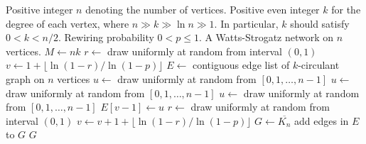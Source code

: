 
\begin{algorithmic}[1]
\Require Positive integer $n$ denoting the number of vertices. Positive
  even integer $k$ for the degree of each vertex, where
  $n \gg k \gg \ln n \gg 1$. In particular, $k$ should satisfy
  $0 < k < n/2$. Rewiring probability $0 < p \leq 1$.
\Ensure A Watts-Strogatz network on $n$ vertices.
\State $M \gets nk$
\State $r \gets$ draw uniformly at random from interval $(0,1)$
\State $v \gets 1 + \lfloor \ln(1 - r) / \ln(1 - p) \rfloor$
\State $E \gets$ contiguous edge list of $k$-circulant graph on $n$ vertices
  \State $u \gets$ draw uniformly at random from $[0, 1, \dots, n-1]$
      \State $u \gets$ draw uniformly at random from $[0, 1, \dots, n-1]$
    \EndWhile
  \Else
      \State $u \gets$ draw uniformly at random from $[0, 1, \dots, n-1]$\label{alg:Watts_Strogatz:choose_vertex_odd_index}
    \EndWhile
  \EndIf
  \State $E[v-1] \gets u$
  \State $r \gets$ draw uniformly at random from interval $(0,1)$
  \State $v \gets v + 1 + \lfloor \ln(1 - r) / \ln(1 - p) \rfloor$
\EndWhile
\State $G \gets \overline{K_n}$
\State add edges in $E$ to $G$
\State \Return $G$
\end{algorithmic}
